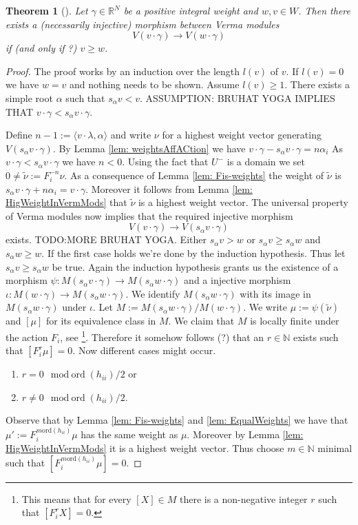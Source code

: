 \documentclass{amsart}
\newtheorem{theorem}{Theorem}[section]
\theoremstyle{definition}
\begin{document}
\begin{theorem}[{\cite[4.4.7]{Joseph1995}}]
	Let $\gamma \in \mathbb R^N$ be a positive integral weight and $w,v\in W$.
	Then there exists a (necessarily injective) morphism between Verma modules
	$$
		V(v\cdot \gamma) \rightarrow V(w\cdot\gamma)
	$$
	if (and only if ?) $v \geq w$.
\end{theorem}
\begin{proof}
	The proof works by an induction over the length $l(v)$ of $v$.
	If $l(v) = 0$ we have $w =v$ and nothing needs to be shown.
	Assume $l(v) \geq 1$. There exists a simple root $\alpha$ such that 
	$s_\alpha v < v$. 
	ASSUMPTION: BRUHAT YOGA IMPLIES THAT $v \cdot \gamma < s_\alpha v \cdot \gamma$.
	
	Define $ n-1:= \langle v\cdot \lambda, \alpha \rangle$ and write $\nu$ for a highest weight vector generating $V(s_\alpha v \cdot \gamma)$.
	By Lemma \ref{lem: weightsAffACtion} we have
	$v\cdot \gamma - s_\alpha v \cdot \gamma = n \alpha_i$
	As $v \cdot \gamma < s_\alpha v \cdot \gamma$ we have $n<0$.
	Using the fact that $U^-$ is a domain we set $ 0 \neq \tilde \nu := F_i^{-n} \nu$.
	As a consequence of Lemma \ref{lem: Fis-weights} the weight of $\tilde\nu$ is 
	$s_\alpha v \cdot \gamma + n\alpha_i = v\cdot \gamma$.
	Moreover it follows from Lemma \ref{lem: HigWeightInVermMods} that 
	$\tilde \nu $ is a highest weight vector. The universal property of Verma modules now implies that the required injective morphism
	$$
			V(v\cdot \gamma) \rightarrow V(s_\alpha v\cdot\gamma)	
	$$
	exists.
	TODO:MORE BRUHAT YOGA. Either $s_\alpha v >w$ or $s_\alpha v \geq s_\alpha w$ and $s_\alpha w \geq w$.
	If the first case holds we're done by the induction hypothesis.
	Thus let $s_\alpha v \geq s_\alpha w$ be true. Again the induction hypothesis grants us the existence of a morphism
	$\psi:M(s_\alpha v\cdot \gamma )\rightarrow M(s_\alpha w\cdot \gamma)$
	and a injective morphism $\iota: M(w \cdot \gamma) \rightarrow M(s_\alpha w\cdot \gamma)$.
	We identify $M(s_\alpha w\cdot \gamma)$ with its image in $M(s_\alpha w\cdot \gamma)$ under $\iota$.
	Let $M := M(s_\alpha w\cdot \gamma)/ M(w\cdot \gamma)$.
	We write $\mu := \psi(\tilde\nu)$ and $[\mu]$ for its equivalence class in $M$. 
	We claim that $M$ is locally finite under the action $F_i$, see \cite[4.3.5]{Joseph1995} \footnote{
	This means that for every $[X] \in M$ there is a non-negative integer $r$ such that $[F_i^r X] = 0$. 
	}.
	Therefore it somehow follows (?) that an  $r\in \mathbb N$ exists such that $[F_i^r \mu] =0$.
	Now different cases might occur.
	\begin{enumerate}
		\item $r = 0 \mod \text{ord}(h_{ii})/2$ or
		\item $r \neq 0 \mod \text{ord}(h_{ii})/2$.
	\end{enumerate}
	Observe that by Lemma \ref{lem: Fis-weights} and \ref{lem: EqualWeights} we have that $\mu':= F_i^{m \text{ord}(h_{ii})} \mu$ has the same weight as $\mu$.
	Moreover by Lemma \ref{lem: HigWeightInVermMods} it is a highest weight vector.
	Thus choose $m\in \mathbb N$ minimal such that $[F_i^{m \text{ord}(h_{ii})} \mu] = 0$. 
\end{proof}
\end{document}
